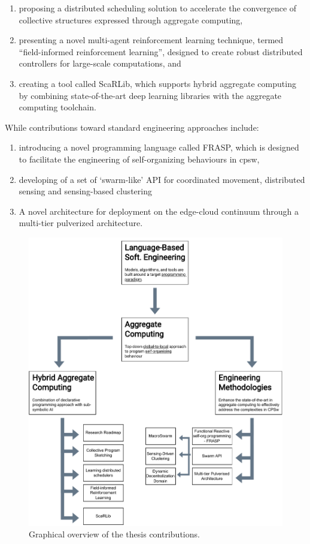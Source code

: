 \begin{refsection}
\begin{enumerate}
    \item proposing a distributed scheduling solution to accelerate the convergence of collective structures expressed through aggregate computing,
    \item presenting a novel multi-agent reinforcement learning technique, termed ``field-informed reinforcement learning'', designed to create robust distributed controllers for large-scale computations, and
    \item creating a tool called ScaRLib, which supports hybrid aggregate computing by combining state-of-the-art deep learning libraries with the aggregate computing toolchain.
\end{enumerate}
While contributions toward standard engineering approaches include:
\begin{enumerate}
    \item introducing a novel programming language called FRASP, 
    which is designed to facilitate the engineering of self-organizing behaviours in \ac{cpsw},
    \item developing of a set of `swarm-like' API for coordinated movement, distributed sensing and sensing-based clustering
    \item A novel architecture for deployment on the edge-cloud continuum through a multi-tier pulverized architecture.
\end{enumerate}
\begin{figure}
    \includegraphics[width=\textwidth]{chapters/img/contribution-visual.drawio.pdf}
    \caption{Graphical overview of the thesis contributions.}
\end{figure}

\end{refsection}
